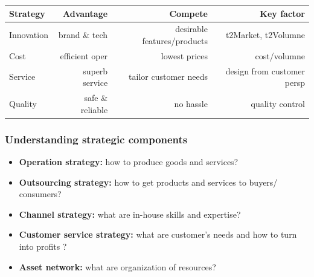 \documentclass[10pt,handout,notes=show]{beamer}
\begin{document}
\begin{frame}
{    \begin{tabular}{lrrr} \hline
      Strategy   & Advantage      & Compete                     & Key factor \\ \hline
      Innovation & brand \& tech  & desirable features/products & t2Market, t2Volumne \\
      Cost       & efficient oper & lowest prices               & cost/volumne \\
      Service    & superb service & tailor customer needs       & design from customer persp \\
      Quality    & safe \& reliable& no hassle                  & quality control \\ \hline
    \end{tabular}

  }
\end{frame}

\begin{frame}[label=stra]
  \frametitle{Understanding strategic components }

   \begin{itemize}
    \item \textbf{Operation strategy:} how to produce goods and services?
    \item \textbf{Outsourcing strategy:} how to get products and services to buyers/ consumers?  \hfill \hyperlink{outs}{}
    \item \textbf{Channel strategy:} what are in-house skills and expertise? \hfill \hyperlink{chan}{}
    \item \textbf{Customer service strategy:} what are customer's needs and how to turn into profits ? \hfill \hyperlink{chan}{}
    \item \textbf{Asset network:} what are organization of resources? \hfill \hyperlink{asset}{}
   \end{itemize}

\end{frame}
\end{document}

